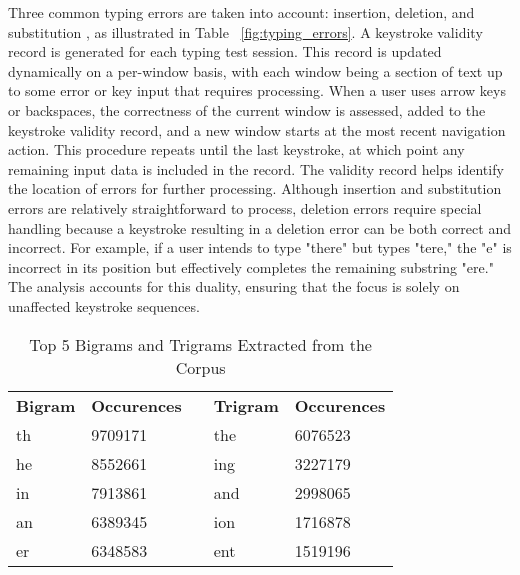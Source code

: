 \noindent Three common typing errors are taken into account: insertion, deletion, and substitution \citep{navarro2001guided}, as illustrated in Table ~\ref{fig:typing_errors}. A keystroke validity record is generated for each typing test session. This record is updated dynamically on a per-window basis, with each window being a section of text up to some error or key input that requires processing. When a user uses arrow keys or backspaces, the correctness of the current window is assessed, added to the keystroke validity record, and a new window starts at the most recent navigation action. This procedure repeats until the last keystroke, at which point any remaining input data is included in the record. The validity record helps identify the location of errors for further processing. Although insertion and substitution errors are relatively straightforward to process, deletion errors require special handling because a keystroke resulting in a deletion error can be both correct and incorrect. For example, if a user intends to type "there" but types "tere," the "e" is incorrect in its position but effectively completes the remaining substring "ere." The analysis accounts for this duality, ensuring that the focus is solely on unaffected keystroke sequences.

\begin{table}[h]
\caption{Top 5 Bigrams and Trigrams Extracted from the Corpus}
\begin{center}
\begin{tabular}{lllll}
\textbf{Bigram} & \textbf{Occurences} &  & \textbf{Trigram} & \textbf{Occurences} \\
th              & 9709171             &  & the              & 6076523             \\
he              & 8552661             &  & ing              & 3227179             \\
in              & 7913861             &  & and              & 2998065             \\
an              & 6389345             &  & ion              & 1716878             \\
er              & 6348583             &  & ent              & 1519196            
\end{tabular}
\end{center}
\label{fig:ngrams}
\end{table}

